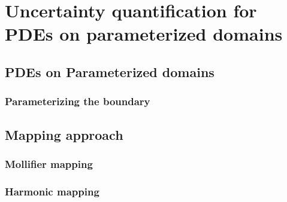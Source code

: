 \chapter[Uncertainty quantification for parameterized domains]{Uncertainty quantification for PDEs on parameterized domains}\label{ch:uncertainty-quantification-for-paramterized-domains}



\section{PDEs on Parameterized domains}\label{sec:parameterized-domains}


\subsection{Parameterizing the boundary}\label{subsec:expansion-basis}


\section{Mapping approach}\label{sec:mapping-approach}


\subsection{Mollifier mapping}\label{subsec:mollifier-mapping}


\subsection{Harmonic mapping}\label{subsec:harmonic-mapping}


\newpage\null\thispagestyle{empty}
